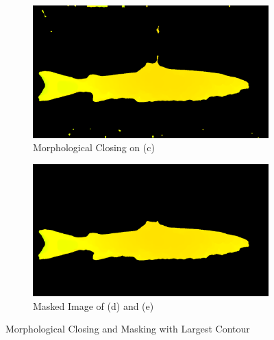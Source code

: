 \begin{figure}[H]
    \medskip
    \begin{subfigure}{0.49\textwidth}
        \includegraphics[width=\linewidth]{images/implementation/5_closing_on_color_filtered_image}
        \caption{Morphological Closing on (c)} 
        \label{fig:morphological_closing}
    \end{subfigure}\hspace*{\fill}
    \begin{subfigure}{0.49\textwidth}
        \includegraphics[width=\linewidth]{images/implementation/6_masked_source}
        \caption{Masked Image of (d) and (e)} 
        \label{fig:masked_source}
    \end{subfigure}
    \caption{Morphological Closing and Masking with Largest Contour} 
    \label{fig:algorithm}
\end{figure}



